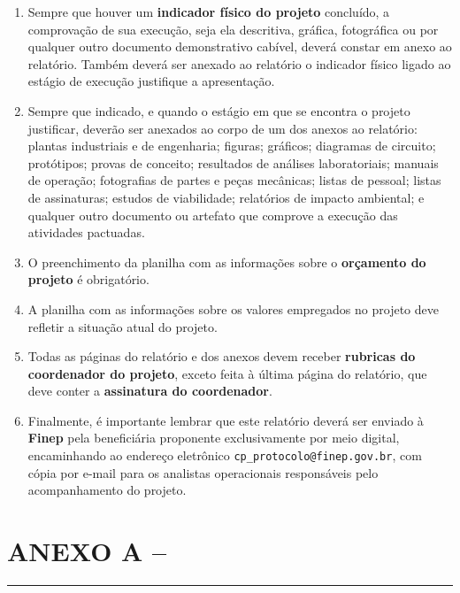 \documentclass[a4paper,12pt]{article}
\begin{document}
\begin{mdframed}[linecolor=black,linewidth=1pt,backgroundcolor=gray!40]
\begin{enumerate}[label=14.\arabic*.,leftmargin=1cm]
    \item Sempre que houver um \textbf{indicador físico do projeto} concluído, a comprovação de sua execução, seja ela descritiva, gráfica, fotográfica ou por qualquer outro documento demonstrativo cabível, deverá constar em anexo ao relatório. Também deverá ser anexado ao relatório o indicador físico ligado ao estágio de execução justifique a apresentação.
    \item Sempre que indicado, e quando o estágio em que se encontra o projeto justificar, deverão ser anexados ao corpo de um dos anexos ao relatório: plantas industriais e de engenharia; figuras; gráficos; diagramas de circuito; protótipos; provas de conceito; resultados de análises laboratoriais; manuais de operação; fotografias de partes e peças mecânicas; listas de pessoal; listas de assinaturas; estudos de viabilidade; relatórios de impacto ambiental; e qualquer outro documento ou artefato que comprove a execução das atividades pactuadas.
    \item O preenchimento da planilha com as informações sobre o \textbf{orçamento do projeto} é obrigatório.
    \item A planilha com as informações sobre os valores empregados no projeto deve reﬂetir a situação atual do projeto.
    \item Todas as páginas do relatório e dos anexos devem receber \textbf{rubricas do coordenador do projeto}, exceto feita à última página do relatório, que deve conter a \textbf{assinatura do coordenador}.
    \item Finalmente, é importante lembrar que este relatório deverá ser enviado à \textbf{Finep} pela beneficiária proponente exclusivamente por meio digital, encaminhando ao endereço eletrônico \texttt{cp\_protocolo@finep.gov.br}, com cópia por e-mail para os analistas operacionais responsáveis pelo acompanhamento do projeto.
\end{enumerate}
\end{mdframed}
\newpage

\section{ANEXO A – \color{blue}{[preencher com o texto descrevendo o indicador físico da atividade 1.1]}}
\vspace{-0.8cm} %
    \rule{\textwidth}{2pt} %
    
\end{document}
